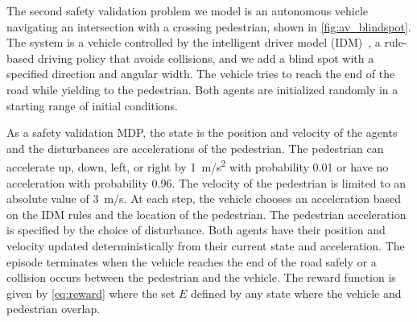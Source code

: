 The second safety validation problem we model is an autonomous vehicle navigating an intersection with a crossing pedestrian, shown in \cref{fig:av_blindspot}. The system is a vehicle controlled by the intelligent driver model (IDM)~\cite{kesting2010enhanced}, a rule-based driving policy that avoids collisions, and we add a blind spot with a specified direction and angular width. The vehicle tries to reach the end of the road while yielding to the pedestrian. Both agents are initialized randomly in a starting range of initial conditions. 

As a safety validation MDP, the state is the position and velocity of the agents and the disturbances are accelerations of the pedestrian. The pedestrian can accelerate up, down, left, or right by \SI{1}{m/s^2} with probability \num{0.01} or have no acceleration with probability \num{0.96}. The velocity of the pedestrian is limited to an absolute value of \SI{3}{m/s}. At each step, the vehicle chooses an acceleration based on the IDM rules and the location of the pedestrian.  The pedestrian acceleration is specified by the choice of disturbance. Both agents have their position and velocity updated deterministically from their current state and acceleration. The episode terminates when the vehicle reaches the end of the road safely or a collision occurs between the pedestrian and the vehicle. The reward function is given by \cref{eq:reward} where the set $E$ defined by any state where the vehicle and pedestrian overlap.  


